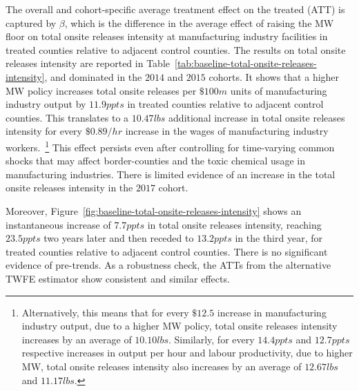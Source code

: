 \documentclass[12pt, english]{article}
\begin{document}
    The overall and cohort-specific average treatment effect on the treated (ATT) is captured by $\beta$, which is the difference in the average effect of raising the MW floor on total onsite releases intensity at manufacturing industry facilities in treated counties relative to adjacent control counties. The results on total onsite releases intensity are reported in Table~\ref{tab:baseline-total-onsite-releases-intensity}, and dominated in the $2014$ and $2015$ cohorts. It shows that a higher MW policy increases total onsite releases per $\$100m$ units of manufacturing industry output by $11.9ppts$ in treated counties relative to adjacent control counties. This translates to a $10.47lbs$ additional increase in total onsite releases intensity for every $\$0.89/hr$ increase in the wages of manufacturing industry workers.~\footnote{\tiny Alternatively, this means that for every $\$12.5$ increase in manufacturing industry output, due to a higher MW policy, total onsite releases intensity increases by an average of $10.10lbs$. Similarly, for every $14.4ppts$ and $12.7ppts$ respective increases in output per hour and labour productivity, due to higher MW, total onsite releases intensity also increases by an average of $12.67lbs$ and $11.17lbs$.} This effect persists even after controlling for time-varying common shocks that may affect border-counties and the toxic chemical usage in manufacturing industries. There is limited evidence of an increase in the total onsite releases intensity in the $2017$ cohort.
    

    Moreover, Figure~\ref{fig:baseline-total-onsite-releases-intensity} shows an instantaneous increase of $7.7ppts$ in total onsite releases intensity, reaching $23.5ppts$ two years later and then receded to $13.2ppts$ in the third year, for treated counties relative to adjacent control counties. There is no significant evidence of pre-trends. As a robustness check, the ATTs from the alternative TWFE estimator show consistent and similar effects.
\end{document}
